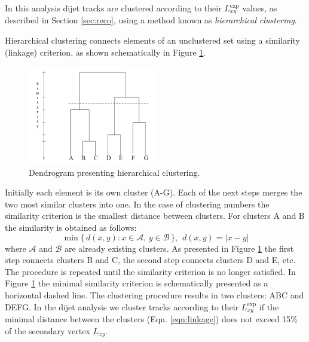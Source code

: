 
In this analysis dijet tracks are clustered
according to their $L_{xy}^\text{exp}$ values, as described in Section \ref{sec:reco},
using a method known as {\it hierarchical clustering}. 

Hierarchical clustering connects elements of an unclustered set using a similarity (linkage) criterion,
as shown schematically in Figure \ref{fig:dendrogram}.
\begin{figure}[htbp]
\centering
\includegraphics[width=0.5\textwidth]{plots/dendrogram2.png}
\caption{Dendrogram presenting hierarchical clustering. \label{fig:dendrogram}}
\end{figure}

 Initially each element is its own cluster (A-G). Each of the next steps merges 
the two most similar clusters into one.
In the case of clustering numbers the similarity criterion is the smallest distance 
between clusters. For clusters A and B the similarity is obtained as follows:
\begin{equation}
\min \{\, d(x,y) : x \in \mathcal{A},\, y \in \mathcal{B} \,\}, \hspace{5pt} d(x,y)=|x-y| 
\label{eqn:linkage}
\end{equation}
where $\mathcal{A}$ and $\mathcal{B}$ are already existing clusters.
 As presented in Figure \ref{fig:dendrogram} the first step connects clusters B and C, the second step connects clusters D and E, etc.
The procedure is repeated until the similarity criterion is no longer satisfied. In Figure \ref{fig:dendrogram} the minimal similarity criterion is 
schematically presented as a horizontal
dashed line. The clustering procedure results in two clusters: ABC and DEFG. In the dijet analysis we cluster tracks according to 
their $L_{xy}^\text{exp}$ if the minimal distance between the clusters (Eqn. \ref{eqn:linkage}) does not exceed 15\% of the secondary vertex $L_{xy}$.

